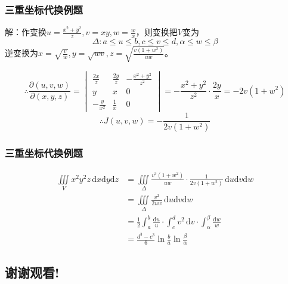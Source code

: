 \documentclass[xetex]{beamer}
\begin{document}
\begin{frame}
    \frametitle{三重坐标代换例题}

    解：作变换$\displaystyle u=\frac{x^2+y^2}{z},v=xy,w=\frac{w}{x}$，则变换把$V$变为
    $$\Delta: a\leq u\leq b,c\leq v\leq d, \alpha\leq w\leq\beta$$
    逆变换为$\displaystyle x=\sqrt{\frac{v}{w}},y=\sqrt{wv},z=\sqrt{\frac{v(1+w^2)}{uw}}$。

    $$\therefore \frac{\partial(u,v,w)}{\partial(x,y,z)}=\begin{vmatrix}
        \frac{2x}{z} & \frac{2y}{z} & -\frac{x^2+y^2}{z^2} \\
        y & x & 0 \\
        -\frac{y}{x^2} & \frac{1}{x} & 0
    \end{vmatrix}=-\frac{x^2+y^2}{z^2}\cdot\frac{2y}{x}=-2v(1+w^2)$$
    $$\therefore J(u,v,w)=-\frac{1}{2v(1+w^2)}$$

\end{frame}

\begin{frame}
    \frametitle{三重坐标代换例题}

    \begin{align*}
        \iiint\limits_Vx^2y^2z\,\mathrm{d}x\mathrm{d}y\mathrm{d}z 
        &= \iiint\limits_\Delta\frac{v^3(1+w^2)}{uw}\cdot\frac{1}{2v(1+w^2)}\,\mathrm{d}u\mathrm{d}v\mathrm{d}w \\
        &= \iiint\limits_\Delta\frac{v^2}{2uw}\,\mathrm{d}u\mathrm{d}v\mathrm{d}w \\
        &= \frac{1}{2}\int_a^b\frac{\mathrm{d}u}{u}\cdot\int_c^dv^2\,\mathrm{d}v\cdot\int_\alpha^\beta\frac{\mathrm{d}w}{w} \\
        &= \frac{d^3-c^3}{6}\ln\frac{b}{a}\ln\frac{\beta}{\alpha}
    \end{align*}

\end{frame}

\begin{frame}
    \section{谢谢观看!}
\end{frame} 
\end{document}
